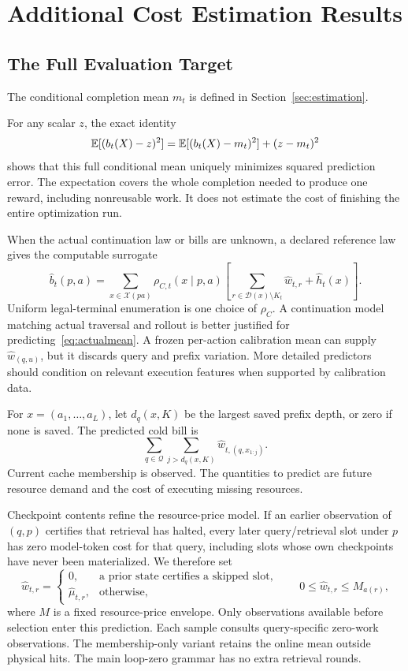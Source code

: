 \section{Additional Cost Estimation Results}
\label{app:cost-estimation}
\subsection{The Full Evaluation Target}
The conditional completion mean $m_t$ is defined in Section~\ref{sec:estimation}.

For any scalar $z$, the exact identity
\begin{equation}
 \mathbb{E}[(b_t(X)-z)^2]=\mathbb{E}[(b_t(X)-m_t)^2]+(z-m_t)^2
 \label{eq:mse}
\end{equation}
shows that this full conditional mean uniquely minimizes squared prediction error. The expectation covers the whole completion needed to produce one reward, including nonreusable work. It does not estimate the cost of finishing the entire optimization run.

When the actual continuation law or bills are unknown, a declared reference law gives the computable surrogate
\begin{equation}
 \widehat b_t(p,a)=\sum_{x\in\mathcal X(pa)}\rho_{C,t}(x\mid p,a)
  \left[\sum_{r\in\mathcal D(x)\setminus K_t}\widehat w_{t,r}+\widehat h_t(x)\right].
 \label{eq:fullestimate}
\end{equation}
Uniform legal-terminal enumeration is one choice of $\rho_C$. A continuation model matching actual traversal and rollout is better justified for predicting~\eqref{eq:actualmean}. A frozen per-action calibration mean can supply $\widehat w_{(q,u)}$, but it discards query and prefix variation. More detailed predictors should condition on relevant execution features when supported by calibration data.

For $x=(a_1,\ldots,a_L)$, let $d_q(x,K)$ be the largest saved prefix depth, or zero if none is saved. The predicted cold bill is
\[
 \sum_{q\in\mathcal Q}\sum_{j>d_q(x,K)}\widehat w_{t,(q,x_{1:j})}.
\]
Current cache membership is observed. The quantities to predict are future resource demand and the cost of executing missing resources.

Checkpoint contents refine the resource-price model. If an earlier observation
of $(q,p)$ certifies that retrieval has halted, every later query/retrieval slot
under $p$ has zero model-token cost for that query, including slots whose own
checkpoints have never been materialized. We therefore set
\begin{equation}
 \widehat w_{t,r}=\begin{cases}0,&\text{a prior state certifies a skipped slot},\\
 \widehat\mu_{t,r},&\text{otherwise},\end{cases}
 \qquad 0\le\widehat w_{t,r}\le M_{a(r)},
 \label{eq:state-price}
\end{equation}
where $M$ is a fixed resource-price envelope. Only observations available
before selection enter this prediction. Each sample consults query-specific
zero-work observations. The membership-only variant retains the online mean
outside physical hits. The main loop-zero grammar has no extra retrieval rounds.

